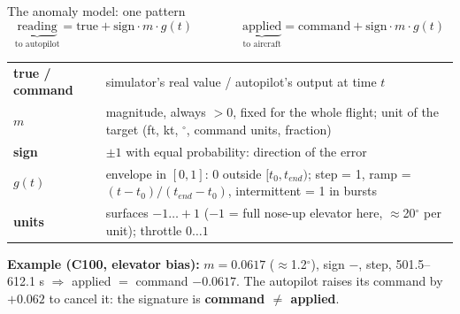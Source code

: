\documentclass[aspectratio=169,11pt]{beamer}
\begin{document}
\begin{frame}{The anomaly model: one pattern}
  \vspace{-0.6em}
  \[
    \underbrace{\text{reading}}_{\text{to autopilot}} = \text{true} + \text{sign}\cdot m\cdot g(t)
    \qquad\qquad
    \underbrace{\text{applied}}_{\text{to aircraft}} = \text{command} + \text{sign}\cdot m\cdot g(t)
  \]
  \small
  \begin{tabularx}{\textwidth}{@{}l L@{}}
    \toprule
    \textbf{true / command} & simulator's real value / autopilot's output at time $t$ \\
    \textbf{$m$} & magnitude, always $> 0$, fixed for the whole flight; unit of the target (ft, kt, $^\circ$, command units, fraction) \\
    \textbf{sign} & $\pm1$ with equal probability: direction of the error \\
    \textbf{$g(t)$} & envelope in $[0,1]$: 0 outside $[t_0, t_{end})$; step = 1, ramp = $(t-t_0)/(t_{end}-t_0)$, intermittent = 1 in bursts \\
    \textbf{units} & surfaces $-1\dots+1$ ($-1$ = full nose-up elevator here, $\approx$20$^\circ$ per unit); throttle $0\dots1$ \\
    \bottomrule
  \end{tabularx}
  \vspace{0.3em}

  \small\textbf{Example (C100, elevator bias):} $m = 0.0617$ ($\approx$1.2$^\circ$), sign $-$, step, 501.5--612.1 s $\Rightarrow$ applied $=$ command $- 0.0617$.
  The autopilot raises its command by $+0.062$ to cancel it: the signature is \textbf{command $\neq$ applied}.
\end{frame}
\end{document}
